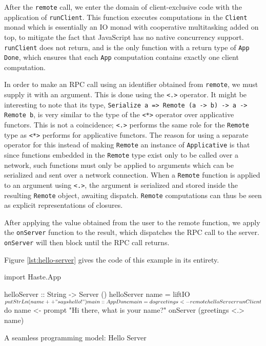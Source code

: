 \documentclass[preprint]{sigplanconf}
\begin{document}
After the \lstinline!remote! call, we enter the domain of client-exclusive code
with the application of \lstinline!runClient!. This function executes
computations in the \lstinline!Client! monad which is essentially an
IO monad with cooperative multitasking added on top, to mitigate the fact that
JavaScript has no native concurrency support. \lstinline!runClient! does not
return, and is the only function with a return type of \lstinline!App Done!,
which ensures that each \lstinline!App! computation contains exactly one client
computation.

In order to make an RPC call using an identifier obtained from
\lstinline!remote!, we must supply it with an argument. This is done using the
\lstinline!<.>! operator. It might be interesting to note that its type,
\linebreak
\lstinline!Serialize a => Remote (a -> b) -> a -> Remote b!,
is very similar to the type of the \lstinline!<*>! operator over applicative
functors. This is not a coincidence; \lstinline!<.>! performs the same role
for the \lstinline!Remote! type as \lstinline!<*>! performs for applicative
functors. The reason for using a separate operator for this instead of making
\lstinline!Remote! an instance of \lstinline!Applicative! is that since
functions embedded in the \lstinline!Remote! type exist only to be called over
a network, such functions must only be applied to arguments which can be
serialized and sent over a network connection. When a \lstinline!Remote!
function is applied to an argument using \lstinline!<.>!, the argument is
serialized and stored inside the resulting \lstinline!Remote! object, awaiting
dispatch. \lstinline!Remote! computations can thus be seen as explicit
representations of closures.

After applying the value obtained from the user to the remote function,
we apply the \lstinline!onServer! function to the result, which dispatches
the RPC call to the server. \lstinline!onServer! will then block until the
RPC call returns.

Figure \ref{lst:hello-server} gives the code of this example in its entirety.

\begin{listingfloat}
\begin{code}
import Haste.App

helloServer :: String -> Server ()
helloServer name =
  liftIO $ putStrLn (name ++ " says hello!")

main :: App Done
main = do
  greetings <- remote helloServer

  runClient $ do
    name <- prompt "Hi there, what is your name?"
    onServer (greetings <.> name)
\end{code}
\caption{A seamless programming model: Hello Server}
\label{lst:hello-server}
\end{listingfloat}
\end{document}
